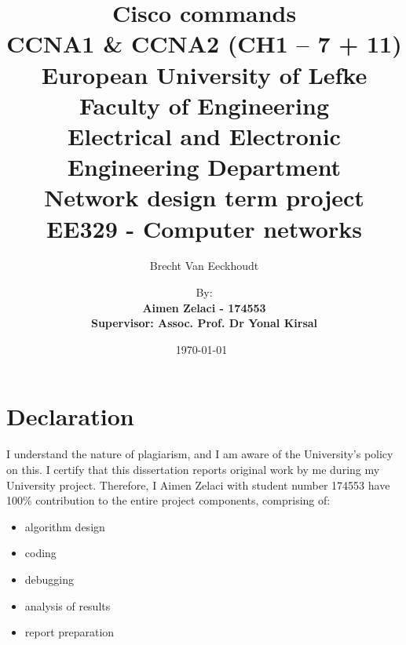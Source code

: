\documentclass[ a4, 12pt, onecolumn]{IEEEtran}
\title{Cisco commands \\CCNA1 \& CCNA2 (CH1 -- 7 + 11)}
\author{Brecht Van Eeckhoudt}
\date{\today \ \currenttime}
\begin{document}
\begin{titlepage}
\onecolumn
\centering

\title{\phantom{2SSSS}\\[2 cm]{European University of Lefke \\ [1cm] \Large {Faculty of Engineering}
\\[1 cm]{ Electrical and Electronic Engineering Department}}
\\ [2cm] \textbf{Network design term project} \\ [1 cm]{EE329 - Computer networks}}
\author{ By:\\ \Large \textbf{Aimen Zelaci - 174553} \\[ 0.4 cm]{\large \textbf{Supervisor: Assoc. Prof. Dr Yonal Kirsal}} \\ [2 cm] }
\maketitle
{}
\end{titlepage}

\tableofcontents
\clearpage
\listoffigures
\listoftables
\clearpage

\section{Declaration}
I understand the nature of plagiarism, and I am aware of the University’s policy on this.
I certify that this dissertation reports original work by me during my University project. Therefore, I Aimen Zelaci with student number 174553 have 100\% contribution to the entire project components, comprising of:
\begin{itemize}
\item algorithm design 
\item coding
\item debugging 
\item analysis of results 
\item report preparation 

\end{itemize}
\end{document}
